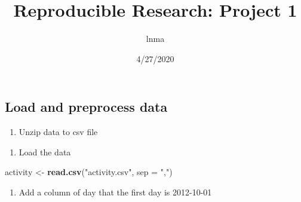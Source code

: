 \documentclass[
]{article}
\title{Reproducible Research: Project 1}
\author{lnma}
\date{4/27/2020}
\newenvironment{Shaded}{\begin{snugshade}}{\end{snugshade}}
\newcommand{\DataTypeTok}[1]{\textcolor[rgb]{0.13,0.29,0.53}{#1}}
\newcommand{\DecValTok}[1]{\textcolor[rgb]{0.00,0.00,0.81}{#1}}
\newcommand{\KeywordTok}[1]{\textcolor[rgb]{0.13,0.29,0.53}{\textbf{#1}}}
\newcommand{\NormalTok}[1]{#1}
\newcommand{\OperatorTok}[1]{\textcolor[rgb]{0.81,0.36,0.00}{\textbf{#1}}}
\newcommand{\StringTok}[1]{\textcolor[rgb]{0.31,0.60,0.02}{#1}}
\providecommand{\tightlist}{%
  \setlength{\itemsep}{0pt}\setlength{\parskip}{0pt}}
\begin{document}
\maketitle

\hypertarget{load-and-preprocess-data}{%
\subsection{Load and preprocess data}\label{load-and-preprocess-data}}

\begin{enumerate}
\def\labelenumi{\arabic{enumi}.}
\tightlist
\item
  Unzip data to csv file
\end{enumerate}

\begin{Shaded}
\end{Shaded}

\begin{enumerate}
\def\labelenumi{\arabic{enumi}.}
\setcounter{enumi}{1}
\tightlist
\item
  Load the data
\end{enumerate}

\begin{Shaded}
\begin{Highlighting}[]
\NormalTok{activity <-}\StringTok{ }\KeywordTok{read.csv}\NormalTok{(}\StringTok{"activity.csv"}\NormalTok{, }\DataTypeTok{sep =} \StringTok{","}\NormalTok{)}
\end{Highlighting}
\end{Shaded}

\begin{enumerate}
\def\labelenumi{\arabic{enumi}.}
\setcounter{enumi}{2}
\tightlist
\item
  Add a column of day that the first day is 2012-10-01
\end{enumerate}

\begin{Shaded}
\end{Shaded}
\end{document}
